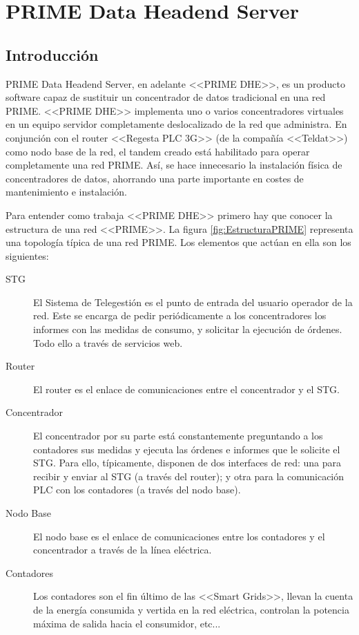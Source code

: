 \chapter{PRIME Data Headend Server}
\section{Introducción}
PRIME Data Headend Server, en adelante <<PRIME DHE>>, es un producto software capaz de sustituir un concentrador de datos tradicional en una red PRIME. <<PRIME DHE>> implementa uno o varios concentradores virtuales en un equipo servidor completamente deslocalizado de la red que administra. En conjunción con el router <<Regesta PLC 3G>> (de la compañía <<Teldat>>) como nodo base de la red, el tandem creado está habilitado para operar completamente una red PRIME. Así, se hace innecesario la instalación física de concentradores de datos, ahorrando una parte importante en costes de mantenimiento e instalación.

Para entender como trabaja <<PRIME DHE>>  primero hay que conocer la estructura de una red <<PRIME>>. La figura \ref{fig:EstructuraPRIME} representa una topología típica de una red PRIME. Los elementos que actúan en ella son los siguientes:
\begin{description}
	\item[STG] El Sistema de Telegestión es el punto de entrada del usuario operador de la red. Este se encarga de pedir periódicamente a los concentradores los informes con las medidas de consumo, y solicitar la ejecución de órdenes. Todo ello a través de servicios web.
	\item[Router] El router es el enlace de comunicaciones entre el concentrador y el STG.
	\item[Concentrador] El concentrador por su parte está constantemente preguntando a los contadores sus medidas y ejecuta las órdenes e informes que le solicite el STG. Para ello, típicamente, disponen de dos interfaces de red: una para recibir y enviar al STG (a través del router); y otra para la comunicación PLC con los contadores (a través del nodo base).
	\item[Nodo Base] El nodo base es el enlace de comunicaciones entre los contadores y el concentrador a través de la línea eléctrica.
	\item[Contadores] Los contadores son el fin último de las <<Smart Grids>>, llevan la cuenta de la energía consumida y vertida en la red eléctrica, controlan la potencia máxima de salida hacia el consumidor, etc...
\end{description}

